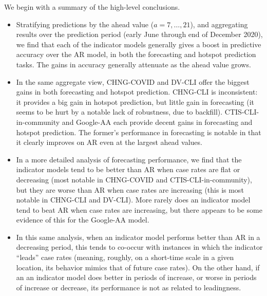 \documentclass[9pt,twocolumn,twoside,lineno]{pnas-new}
\begin{document}
We begin with a summary of the high-level conclusions.  

\begin{itemize}
\item Stratifying predictions by the ahead value ($a=7,\ldots,21$), and
  aggregating results over the prediction period (early June through end of
  December 2020), we find that each of the indicator models generally gives a
  boost in predictive accuracy over the AR model, in both the forecasting and
  hotspot prediction tasks.  The gains in accuracy generally attenuate as the
  ahead value grows. 

\item In the same aggregate view, CHNG-COVID and DV-CLI offer the biggest 
  gains in both forecasting and hotspot prediction.  CHNG-CLI is
  inconsistent: it provides a big gain in hotspot prediction, but little gain 
  in forecasting (it seems to be hurt by a notable lack of robustness, due
  to backfill).  CTIS-CLI-in-community and Google-AA each provide decent 
  gains in forecasting and hotspot prediction.  The former's performance in 
  forecasting is notable in that it clearly improves on AR even at the largest
  ahead values.   

\item In a more detailed analysis of forecasting performance, we find that the
  indicator models tend to be better than AR when case rates are flat or
  decreasing (most notable in CHNG-COVID and CTIS-CLI-in-community), but they
  are worse than AR when case rates are increasing (this is most notable in
  CHNG-CLI and DV-CLI). More rarely does an indicator model tend to beat AR when
  case rates are increasing, but there appears to be some evidence of this for
  the Google-AA model. 

\item In this same analysis, when an indicator model performs better than AR in
  a decreasing period, this tends to co-occur with instances in which the
  indicator ``leads'' case rates (meaning, roughly, on a short-time scale in a
  given location, its behavior mimics that of future case rates).  On
  the other hand, if an an indicator model does better in periods of
  increase, or worse in periods of increase or decrease, its performance is
  not as related to leadingness.   
\end{itemize}
\end{document}
